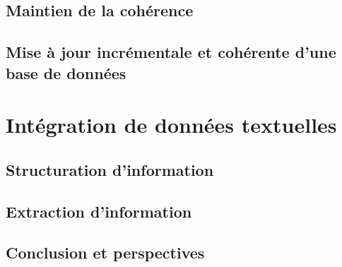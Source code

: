 \chapter{Maintien de la cohérence}
\label{chp:update:intro}
\minitoc


\chapter{Mise à jour incrémentale et cohérente d'une base de données}
\label{chp:update:algos}
\minitoc




\part{Intégration de données textuelles}
\label{part:texts}
\glsresetall


\chapter{Structuration d'information}
\label{chp:struct}
\minitoc


\chapter{Extraction d'information}
\label{chp:tal}
\minitoc




\chapter{Conclusion et perspectives}
\label{chp:conclusion}
\glsresetall
\minitoc


\cleardoublepage    %
\appendix
{}
